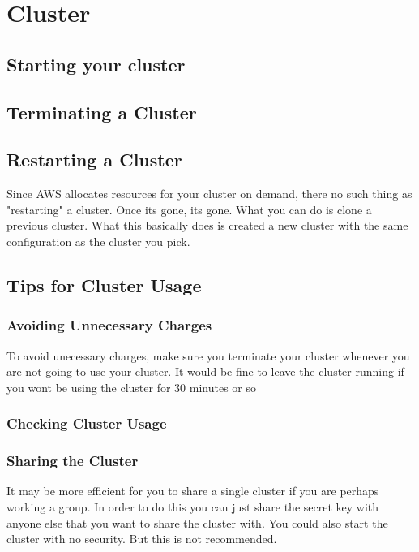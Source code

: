 \documentclass{article}
\begin{document}
\section{Cluster}
\subsection{Starting your cluster}
\subsection{Terminating a Cluster}
\subsection{Restarting a Cluster}
Since AWS allocates resources for your cluster on demand, there no such thing as "restarting" a cluster. Once its gone, its gone. What you can do is clone a previous cluster. What this basically does is created a new cluster with the same configuration as the cluster you pick.
\subsection{Tips for Cluster Usage}
\subsubsection{Avoiding Unnecessary Charges}
To avoid unecessary charges, make sure you terminate your cluster whenever you are not going to use your cluster. It would be fine to leave the cluster running if you wont be using the cluster for 30 minutes or so
\subsubsection{Checking Cluster Usage}
\subsubsection{Sharing the Cluster}
It may be more efficient for you to share a single cluster if you are perhaps working a group. In order to do this you can just share the secret key with anyone else that you want to share the cluster with. You could also start the cluster with no security. But this is not recommended.


\end{document}
